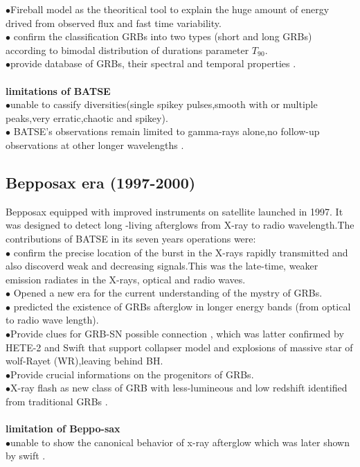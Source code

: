 $\bullet$Fireball model as the theoritical tool to explain the huge amount of energy   drived from observed flux and fast time variability.\\
$\bullet$ confirm  the classification GRBs into two types (short and long GRBs) according to  bimodal distribution of durations parameter $ T_{90} $.\\
$\bullet$provide database of GRBs, their spectral and temporal properties \citep{5}\citep{7}.\\\\
\textbf{limitations of BATSE}\\
$\bullet$unable to cassify  diversities(single spikey pulses,smooth with or multiple peaks,very erratic,chaotic and spikey).\\ 
$\bullet$ BATSE’s observations remain limited to gamma-rays alone,no follow-up observations at other longer wavelengths \citep{5}\citep{6} \citep{7}.
\subsection{Bepposax era (1997-2000)}
Bepposax equipped with improved instruments on satellite launched in 1997. It was designed to detect long -living afterglows from X-ray to  radio wavelength.The contributions of BATSE in its seven years operations were:\\
$\bullet$ confirm the precise location of the burst in the X-rays rapidly transmitted  and also discoverd weak and decreasing signals.This was the late-time, weaker emission radiates in the X-rays, optical and radio waves. \\
$\bullet$ Opened a new era for the current understanding of the mystry of GRBs.\\
$\bullet$ predicted the existence of GRBs afterglow in longer energy bands (from optical to radio wave length).\\
$\bullet$Provide clues for GRB-SN possible connection , which was latter confirmed by
HETE-2 and Swift that support collapser model and explosions of massive star
of wolf-Rayet (WR),leaving behind BH.\\
$\bullet$Provide crucial informations on the progenitors of GRBs.\\
$\bullet$X-ray flash as new class of GRB with less-lumineous and low redshift identified from traditional GRBs \citep{4} \citep{7}.\\\\
\textbf{limitation of Beppo-sax}\\
$\bullet$unable to show the canonical behavior of x-ray afterglow which was later shown by swift \citep{5}.\\\\

